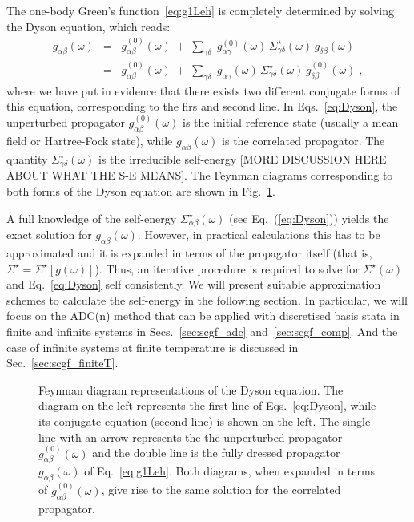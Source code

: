 The one-body Green's function~\eqref{eq:g1Leh} is completely determined by solving the Dyson equation, which reads:
\begin{eqnarray}
  \label{eq:Dyson}
  g_{\alpha\beta}(\omega)&=&g^{(0)}_{\alpha\beta}(\omega) ~+~ \sum_{\gamma\delta} \; g^{(0)}_{\alpha\gamma}(\omega) \, \Sigma_{\gamma\delta}^{\star}(\omega) \, g_{\delta\beta}(\omega) 
  \nonumber \\
  &=&g^{(0)}_{\alpha\beta}(\omega) ~+~ \sum_{\gamma\delta} \; g_{\alpha\gamma}(\omega) \, \Sigma_{\gamma\delta}^{\star}(\omega) \, g^{(0)}_{\delta\beta}(\omega)  \; ,
\end{eqnarray}
where we have put in evidence that there exists two different conjugate forms of this equation, corresponding to the firs and second line. 
In Eqs.~\eqref{eq:Dyson},  the unperturbed propagator $g^{(0)}_{\alpha\beta}(\omega)$ is the initial reference state (usually a mean field or Hartree-Fock state), while $g_{\alpha\beta}(\omega)$ is the correlated propagator. The quantity $\Sigma_{\gamma\delta}^{\star}(\omega)$ is the irreducible self-energy 
 [MORE DISCUSSION HERE ABOUT WHAT THE S-E MEANS]. The Feynman diagrams corresponding to both forms of the Dyson equation are shown in Fig.~\ref{fig:DysonEq}.
 
 A full knowledge of the self-energy  $\Sigma_{\alpha\beta}^{\star}(\omega)$ (see Eq.~(\ref{eq:Dyson})) yields the exact solution for $g_{\alpha\beta}(\omega)$. However, in practical calculations this has to be approximated and it is expanded in terms of the propagator itself (that is, $\Sigma^{\star}=\Sigma^{\star}[g(\omega)]$). Thus, an iterative procedure is required to solve for $\Sigma^{\star}(\omega)$ and Eq.~\eqref{eq:Dyson} self consistently.
 We will present suitable approximation schemes to calculate the self-energy in the following section. In particular, we will focus on the ADC(n) method   that can be applied with discretised basis stata in finite and infinite systems in Secs.~\ref{sec:scgf_adc} and~\ref{sec:scgf_comp}. And the case of infinite systems at finite temperature is discussed in Sec.~\ref{sec:scgf_finiteT}.


\begin{figure}[ht]
\begin{center}
\caption{Feynman diagram representations of the Dyson equation. The diagram on the left represents the first line of 
Eqs.~\eqref{eq:Dyson}, while its conjugate equation (second line) is shown on the left. The single line with an
arrow represents the the unperturbed propagator $g^{(0)}_{\alpha\beta}(\omega)$ and the double line is the fully
dressed propagator $g_{\alpha\beta}(\omega)$ of Eq.~\eqref{eq:g1Leh}.  Both diagrams, when expanded in terms
of $g^{(0)}_{\alpha\beta}(\omega)$, give rise to the same solution for the correlated propagator. } 
\label{fig:DysonEq}
\end{center}
\end{figure}

